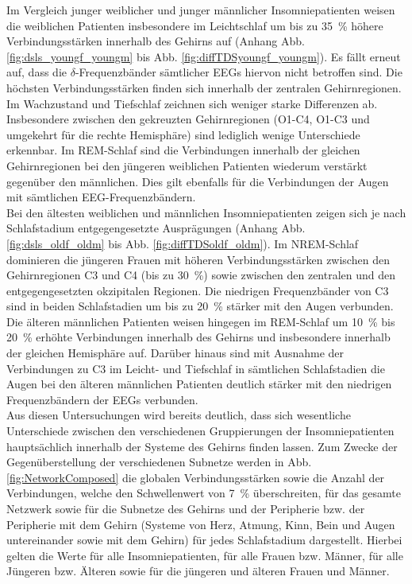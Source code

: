 Im Vergleich junger weiblicher und junger männlicher Insomniepatienten weisen die weiblichen Patienten insbesondere im Leichtschlaf um bis zu 35~\% höhere Verbindungsstärken innerhalb des Gehirns auf (Anhang Abb. \ref{fig:dsls_youngf_youngm} bis Abb. \ref{fig:diffTDSyoungf_youngm}). Es fällt erneut auf, dass die $\delta$-Frequenzbänder sämtlicher \acs{EEG}s hiervon nicht betroffen sind. Die höchsten Verbindungsstärken finden sich innerhalb der zentralen Gehirnregionen. Im Wachzustand und Tiefschlaf zeichnen sich weniger starke Differenzen ab. Insbesondere zwischen den gekreuzten Gehirnregionen (O1-C4, O1-C3 und umgekehrt für die rechte Hemisphäre) sind lediglich wenige Unterschiede erkennbar. Im \acs{REM}-Schlaf sind die Verbindungen innerhalb der gleichen Gehirnregionen bei den jüngeren weiblichen Patienten wiederum verstärkt gegenüber den männlichen. Dies gilt ebenfalls für die Verbindungen der Augen mit sämtlichen \acs{EEG}-Frequenzbändern.\\

Bei den ältesten weiblichen und männlichen Insomniepatienten zeigen sich je nach Schlafstadium entgegengesetzte Ausprägungen (Anhang Abb. \ref{fig:dsls_oldf_oldm} bis Abb. \ref{fig:diffTDSoldf_oldm}). Im \acs{NREM}-Schlaf dominieren die jüngeren Frauen mit höheren Verbindungsstärken zwischen den Gehirnregionen C3 und C4 (bis zu 30~\%) sowie zwischen den zentralen und den entgegengesetzten okzipitalen Regionen. Die niedrigen Frequenzbänder von C3 sind in beiden Schlafstadien um bis zu 20~\% stärker mit den Augen verbunden. Die älteren männlichen Patienten weisen hingegen im \acs{REM}-Schlaf um 10~\% bis 20~\% erhöhte Verbindungen innerhalb des Gehirns und insbesondere innerhalb der gleichen Hemisphäre auf. Darüber hinaus sind mit Ausnahme der Verbindungen zu C3 im Leicht- und Tiefschlaf in sämtlichen Schlafstadien die Augen bei den älteren männlichen Patienten deutlich stärker mit den niedrigen Frequenzbändern der \acs{EEG}s verbunden.\\

Aus diesen Untersuchungen wird bereits deutlich, dass sich wesentliche Unterschiede zwischen den verschiedenen Gruppierungen der Insomniepatienten hauptsächlich innerhalb der Systeme des Gehirns finden lassen. Zum Zwecke der Gegenüberstellung der verschiedenen Subnetze werden in Abb. \ref{fig:NetworkComposed} die globalen Verbindungsstärken sowie die Anzahl der Verbindungen, welche den Schwellenwert von 7~\% überschreiten, für das gesamte Netzwerk sowie für die Subnetze des Gehirns und der Peripherie bzw. der Peripherie mit dem Gehirn (Systeme von Herz, Atmung, Kinn, Bein und Augen untereinander sowie mit dem Gehirn) für jedes Schlafstadium dargestellt. Hierbei gelten die Werte für alle Insomniepatienten, für alle Frauen bzw. Männer, für alle Jüngeren bzw. Älteren sowie für die jüngeren und älteren Frauen und Männer.


